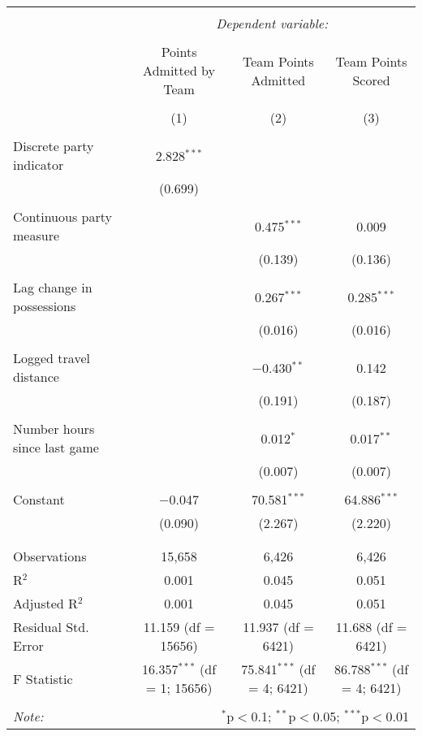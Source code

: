 \documentclass[letterpaper,12pt]{article}
\begin{document}
\hspace{-100pt}
\begin{tabular}{@{\extracolsep{5pt}}lccc}  \\[-1.8ex]\hline  \hline \\[-1.8ex]   & \multicolumn{3}{c}{\textit{Dependent variable:}} \\  \cline{2-4}  \\[-1.8ex] & Points Admitted by Team & Team Points Admitted & Team Points Scored \\  \\[-1.8ex] & (1) & (2) & (3)\\  \hline \\[-1.8ex]   Discrete party indicator & 2.828$^{***}$ &  &  \\    & (0.699) &  &  \\    & & & \\   Continuous party measure &  & 0.475$^{***}$ & 0.009 \\    &  & (0.139) & (0.136) \\    & & & \\   Lag change in possessions &  & 0.267$^{***}$ & 0.285$^{***}$ \\    &  & (0.016) & (0.016) \\    & & & \\   Logged travel distance &  & $-$0.430$^{**}$ & 0.142 \\    &  & (0.191) & (0.187) \\    & & & \\   Number hours since last game &  & 0.012$^{*}$ & 0.017$^{**}$ \\    &  & (0.007) & (0.007) \\    & & & \\   Constant & $-$0.047 & 70.581$^{***}$ & 64.886$^{***}$ \\    & (0.090) & (2.267) & (2.220) \\    & & & \\  \hline \\[-1.8ex]  Observations & 15,658 & 6,426 & 6,426 \\  R$^{2}$ & 0.001 & 0.045 & 0.051 \\  Adjusted R$^{2}$ & 0.001 & 0.045 & 0.051 \\  Residual Std. Error & 11.159 (df = 15656) & 11.937 (df = 6421) & 11.688 (df = 6421) \\  F Statistic & 16.357$^{***}$ (df = 1; 15656) & 75.841$^{***}$ (df = 4; 6421) & 86.788$^{***}$ (df = 4; 6421) \\  \hline  \hline \\[-1.8ex]  \textit{Note:}  & \multicolumn{3}{r}{$^{*}$p$<$0.1; $^{**}$p$<$0.05; $^{***}$p$<$0.01} \\  \end{tabular}  
\end{document}
